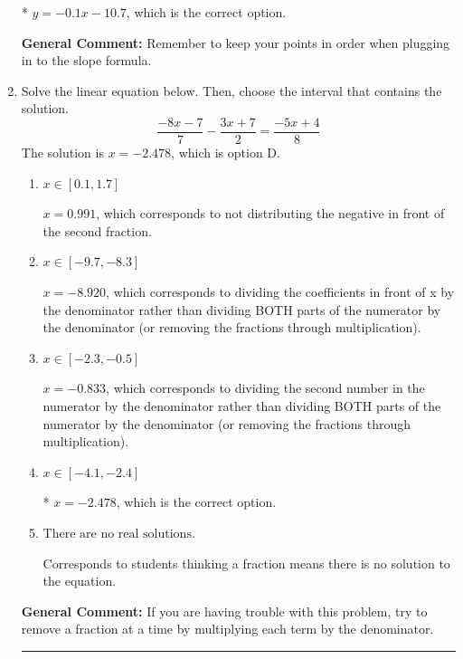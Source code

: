 \documentclass{extbook}[14pt]
\newcommand{\litem}[1]{\item #1

\rule{\textwidth}{0.4pt}}
\begin{document}
\begin{enumerate}
{\begin{enumerate}[label=\Alph*.]
* $y = -0.1x -10.7$, which is the correct option.
\end{enumerate}

\textbf{General Comment:} Remember to keep your points in order when plugging in to the slope formula.
}
\litem{
Solve the linear equation below. Then, choose the interval that contains the solution.
\[ \frac{-8x -7}{7} - \frac{3x + 7}{2} = \frac{-5x + 4}{8} \]The solution is \( x = -2.478 \), which is option D.\begin{enumerate}[label=\Alph*.]
\item \( x \in [0.1, 1.7] \)

 $x = 0.991$, which corresponds to not distributing the negative in front of the second fraction.
\item \( x \in [-9.7, -8.3] \)

 $x = -8.920$, which corresponds to dividing the coefficients in front of x by the denominator rather than dividing BOTH parts of the numerator by the denominator (or removing the fractions through multiplication).
\item \( x \in [-2.3, -0.5] \)

 $x = -0.833$, which corresponds to dividing the second number in the numerator by the denominator rather than dividing BOTH parts of the numerator by the denominator (or removing the fractions through multiplication).
\item \( x \in [-4.1, -2.4] \)

* $x = -2.478$, which is the correct option.
\item \( \text{There are no real solutions.} \)

Corresponds to students thinking a fraction means there is no solution to the equation.
\end{enumerate}

\textbf{General Comment:} If you are having trouble with this problem, try to remove a fraction at a time by multiplying each term by the denominator.
}
\end{enumerate}
\end{document}
